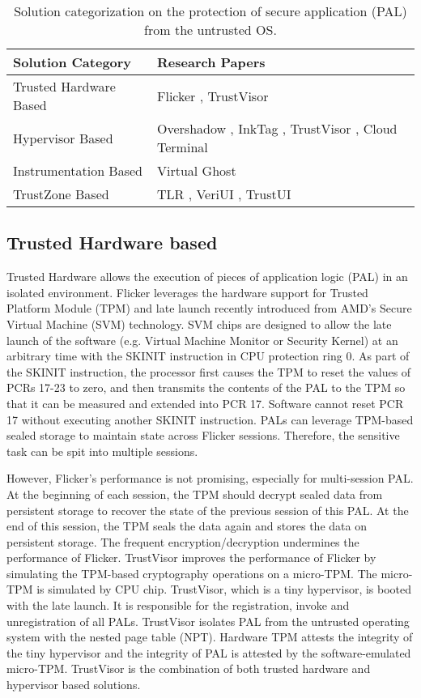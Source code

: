 \begin{table*}[ht]
	\centering
	\begin{tabular}{|l|l|}
		\hline
		\textbf{Solution Category}      & \textbf{Research Papers} \\ \hline
		Trusted Hardware Based & Flicker \cite{Flicker}, TrustVisor \cite{TrustVisor} \\ \hline
		Hypervisor Based       & Overshadow \cite{Overshadow}, InkTag \cite{InkTag}, TrustVisor \cite{TrustVisor}, Cloud Terminal \cite{CloudTerminal}\\ \hline
		Instrumentation Based  & Virtual Ghost \cite{VirtualGhost}\\ \hline
		TrustZone Based        & TLR \cite{TLR}, VeriUI \cite{VeriUI}, TrustUI \cite{TrustUI}\\ \hline
	\end{tabular}
	\caption{Solution categorization on the protection of secure application
	(PAL) from the untrusted OS.}
	\label{table:problem1}
\end{table*}

\subsection{Trusted Hardware based}

Trusted Hardware allows the execution of pieces of application logic (PAL) in
an isolated environment. Flicker \cite{Flicker} leverages the hardware support
for Trusted Platform Module (TPM) \cite{TPM} and late launch recently
introduced from AMD's Secure Virtual Machine (SVM) technology. SVM chips are
designed to allow the late launch of the software (e.g. Virtual Machine Monitor
or Security Kernel) at an arbitrary time with the SKINIT instruction in CPU
protection ring 0. As part of the SKINIT instruction, the processor first
causes the TPM to reset the values of PCRs 17-23 to zero, and then transmits
the contents of the PAL to the TPM so that it can be measured and extended into
PCR 17. Software cannot reset PCR 17 without executing another SKINIT
instruction. PALs can leverage TPM-based sealed storage to maintain state
across Flicker sessions. Therefore, the sensitive task can be spit into
multiple sessions.

However, Flicker's performance is not promising, especially for multi-session
PAL. At the beginning of each session, the TPM should decrypt sealed data from
persistent storage to recover the state of the previous session of this PAL. At
the end of this session, the TPM seals the data again and stores the data on
persistent storage. The frequent encryption/decryption undermines the
performance of Flicker. TrustVisor \cite{TrustVisor} improves the performance
of Flicker by simulating the TPM-based cryptography operations on a micro-TPM.
The micro-TPM is simulated by CPU chip. TrustVisor, which is a tiny hypervisor,
is booted with the late launch. It is responsible for the registration, invoke
and unregistration of all PALs.  TrustVisor isolates PAL from the untrusted
operating system with the nested page table (NPT). Hardware TPM attests the
integrity of the tiny hypervisor and the integrity of PAL is attested by the
software-emulated micro-TPM. TrustVisor is the combination of both trusted
hardware and hypervisor based solutions.

